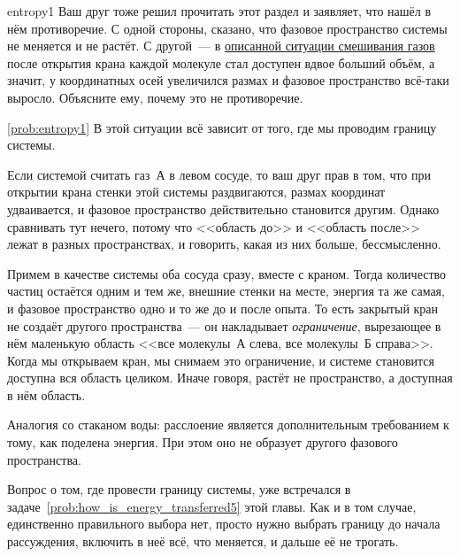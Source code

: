 \begin{problem}{}{entropy1}
    Ваш друг тоже решил прочитать этот раздел и заявляет, что нашёл в нём противоречие. С одной стороны, сказано, что фазовое пространство системы не меняется и не растёт. С другой~--- в \hyperref[situation_two]{описанной ситуации смешивания газов} после открытия крана каждой молекуле стал доступен вдвое больший объём, а значит, у координатных осей увеличился размах и фазовое пространство всё-таки выросло. Объясните ему, почему это не противоречие.
    \begin{sol}{\ref{prob:entropy1}}
        В этой ситуации всё зависит от того, где мы проводим границу системы.

        Если системой считать газ~А в левом сосуде, то ваш друг прав в том, что при открытии крана стенки этой системы раздвигаются, размах координат удваивается, и фазовое пространство действительно становится другим. Однако сравнивать тут нечего, потому что <<область до>> и <<область после>> лежат в разных пространствах, и говорить, какая из них больше, бессмысленно.

        Примем в качестве системы оба сосуда сразу, вместе с краном. Тогда количество частиц остаётся одним и тем же, внешние стенки на месте, энергия та же самая, и фазовое пространство одно и то же до и после опыта. То есть закрытый кран не создаёт другого пространства~--- он накладывает \emph{ограничение}, вырезающее в нём маленькую область <<все молекулы~А слева, все молекулы~Б справа>>. Когда мы открываем кран, мы снимаем это ограничение, и системе становится доступна вся область целиком. Иначе говоря, растёт не пространство, а доступная в нём область.

        Аналогия со стаканом воды: расслоение является дополнительным требованием к тому, как поделена энергия. При этом оно не образует другого фазового пространства.

        Вопрос о том, где провести границу системы, уже встречался в задаче~\ref{prob:how_is_energy_transferred5} этой главы. Как и в том случае, единственно правильного выбора нет, просто нужно выбрать границу до начала рассуждения, включить в неё всё, что меняется, и дальше её не трогать.
    \end{sol}
\end{problem}

